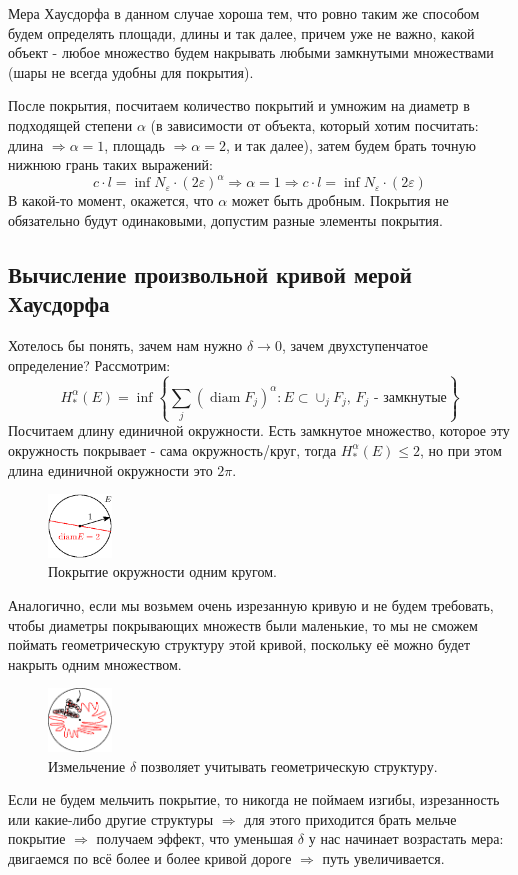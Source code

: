 \documentclass[12pt]{article}
\newcommand{\VE}{\varepsilon}
\theoremstyle{definition}
\DeclareMathOperator{\diam}{\text{diam}}
\newcommand{\ddsum}[2]{\displaystyle\sum\limits_{#1}^{#2}}
\begin{document}
Мера Хаусдорфа в данном случае хороша тем, что ровно таким же способом будем определять площади, длины и так далее, причем уже не важно, какой объект - любое множество будем накрывать любыми замкнутыми множествами (шары не всегда удобны для покрытия). 

После покрытия, посчитаем количество покрытий и умножим на диаметр в подходящей степени $\alpha$ (в зависимости от объекта, который хотим посчитать: длина $\Rightarrow \alpha = 1$, площадь $\Rightarrow \alpha = 2$, и так далее), затем будем брать точную нижнюю грань таких выражений: 
$$
	c{\cdot}l = \inf N_{\VE}{\cdot}(2\VE)^\alpha \Rightarrow \alpha = 1 \Rightarrow c{\cdot}l = \inf N_{\VE}{\cdot}(2\VE)
$$
В какой-то момент, окажется, что $\alpha$ может быть дробным. Покрытия не обязательно будут одинаковыми, допустим разные элементы покрытия.

\subsection*{Вычисление произвольной кривой мерой Хаусдорфа}
Хотелось бы понять, зачем нам нужно $\delta \to 0$, зачем двухступенчатое определение? Рассмотрим:
$$
	H^\alpha_*(E) = \inf\left\{\ddsum{j}{}(\diam{F_j})^\alpha \colon E \subset \cup_j F_j, \, F_j \text{ - замкнутые} \right\}
$$
Посчитаем длину единичной окружности. Есть замкнутое множество, которое эту окружность покрывает - сама окружность/круг, тогда $H^\alpha_*(E) \leq 2$, но при этом длина единичной окружности это $2\pi$. 
\begin{figure}[H]
	\centering
	\includegraphics[width=0.15\textwidth]{MA4L13_2.eps}
	\caption{Покрытие окружности одним кругом.}
	\label{13_2}
\end{figure}
Аналогично, если мы возьмем очень изрезанную кривую и не будем требовать, чтобы диаметры покрывающих множеств были маленькие, то мы не сможем поймать геометрическую структуру этой кривой, поскольку её можно будет накрыть одним множеством. 
\begin{figure}[H]
	\centering
	\includegraphics[width=0.15\textwidth]{MA4L13_3.eps}
	\caption{Измельчение $\delta$ позволяет учитывать геометрическую структуру.}
	\label{13_3}
\end{figure}
Если не будем мельчить покрытие, то никогда не поймаем изгибы, изрезанность или какие-либо другие структуры $\Rightarrow$ для этого приходится брать мельче покрытие $\Rightarrow$ получаем эффект, что уменьшая $\delta$ у нас начинает возрастать мера: двигаемся по всё более и более кривой дороге $\Rightarrow$ путь увеличивается.
\end{document}
